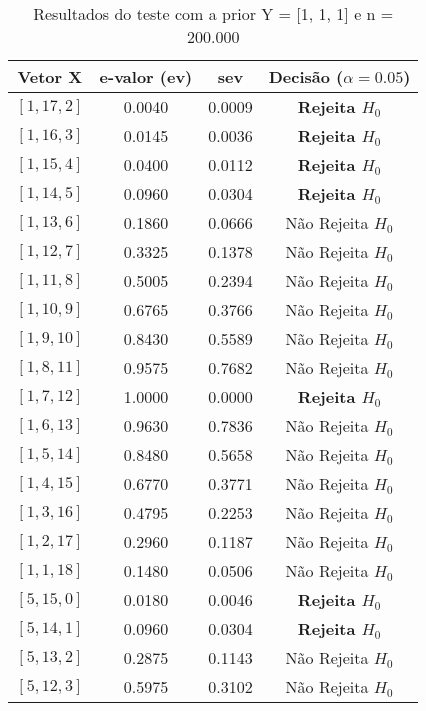 \documentclass[12pt, a4paper]{article}
\begin{document}
\begin{table}[H]
    \centering
    \caption{Resultados do teste com a prior Y = [1, 1, 1] e n = 200.000}
    \label{tab:prior1}
    \begin{tabular}{cccc}
        \toprule
        \textbf{Vetor X} & \textbf{e-valor (ev)} & \textbf{sev} & \textbf{Decisão ($\alpha=0.05$)} \\
        \midrule
        {$[1, 17, 2]$} & 0.0040 & 0.0009 & \textbf{Rejeita $H_0$} \\
        {$[1, 16, 3]$} & 0.0145 & 0.0036 & \textbf{Rejeita $H_0$} \\
        {$[1, 15, 4]$} & 0.0400 & 0.0112 & \textbf{Rejeita $H_0$} \\
        {$[1, 14, 5]$} & 0.0960 & 0.0304 & \textbf{Rejeita $H_0$} \\
        {$[1, 13, 6]$} & 0.1860 & 0.0666 & Não Rejeita $H_0$ \\
        {$[1, 12, 7]$} & 0.3325 & 0.1378 & Não Rejeita $H_0$ \\
        {$[1, 11, 8]$} & 0.5005 & 0.2394 & Não Rejeita $H_0$ \\
        {$[1, 10, 9]$} & 0.6765 & 0.3766 & Não Rejeita $H_0$ \\
        {$[1, 9, 10]$} & 0.8430 & 0.5589 & Não Rejeita $H_0$ \\
        {$[1, 8, 11]$} & 0.9575 & 0.7682 & Não Rejeita $H_0$ \\
        {$[1, 7, 12]$} & 1.0000 & 0.0000 & \textbf{Rejeita $H_0$} \\
        {$[1, 6, 13]$} & 0.9630 & 0.7836 & Não Rejeita $H_0$ \\
        {$[1, 5, 14]$} & 0.8480 & 0.5658 & Não Rejeita $H_0$ \\
        {$[1, 4, 15]$} & 0.6770 & 0.3771 & Não Rejeita $H_0$ \\
        {$[1, 3, 16]$} & 0.4795 & 0.2253 & Não Rejeita $H_0$ \\
        {$[1, 2, 17]$} & 0.2960 & 0.1187 & Não Rejeita $H_0$ \\
        {$[1, 1, 18]$} & 0.1480 & 0.0506 & Não Rejeita $H_0$ \\
        \midrule
        {$[5, 15, 0]$} & 0.0180 & 0.0046 & \textbf{Rejeita $H_0$} \\
        {$[5, 14, 1]$} & 0.0960 & 0.0304 & \textbf{Rejeita $H_0$} \\
        {$[5, 13, 2]$} & 0.2875 & 0.1143 & Não Rejeita $H_0$ \\
        {$[5, 12, 3]$} & 0.5975 & 0.3102 & Não Rejeita $H_0$ \\

\end{tabular}
\end{table}
\end{document}
